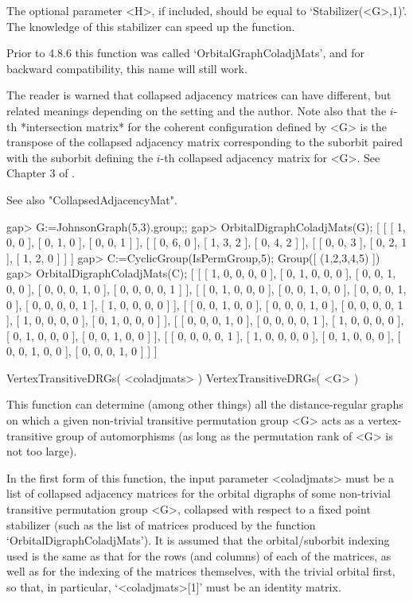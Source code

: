 The optional parameter <H>, if included, should be equal to
`Stabilizer(<G>,1)'. The knowledge of this stabilizer can speed up the
function.

Prior to {\GAP} 4.8.6 this function was called `OrbitalGraphColadjMats',
and for backward compatibility, this name will still work.

The reader is warned that collapsed adjacency matrices can have different,
but related meanings depending on the setting and the author. Note also
that the $i$-th *intersection matrix* for the coherent configuration
defined by <G> is the transpose of the collapsed adjacency matrix
corresponding to the suborbit paired with the suborbit defining the
$i$-th collapsed adjacency matrix for <G>. See Chapter 3 of \cite{Cam99}.

See also "CollapsedAdjacencyMat".

\beginexample
gap> G:=JohnsonGraph(5,3).group;;
gap> OrbitalDigraphColadjMats(G);
[ [ [ 1, 0, 0 ], [ 0, 1, 0 ], [ 0, 0, 1 ] ], 
  [ [ 0, 6, 0 ], [ 1, 3, 2 ], [ 0, 4, 2 ] ], 
  [ [ 0, 0, 3 ], [ 0, 2, 1 ], [ 1, 2, 0 ] ] ]
gap> C:=CyclicGroup(IsPermGroup,5);
Group([ (1,2,3,4,5) ])
gap> OrbitalDigraphColadjMats(C);
[ [ [ 1, 0, 0, 0, 0 ], [ 0, 1, 0, 0, 0 ], [ 0, 0, 1, 0, 0 ], 
      [ 0, 0, 0, 1, 0 ], [ 0, 0, 0, 0, 1 ] ], 
  [ [ 0, 1, 0, 0, 0 ], [ 0, 0, 1, 0, 0 ], [ 0, 0, 0, 1, 0 ], 
      [ 0, 0, 0, 0, 1 ], [ 1, 0, 0, 0, 0 ] ], 
  [ [ 0, 0, 1, 0, 0 ], [ 0, 0, 0, 1, 0 ], [ 0, 0, 0, 0, 1 ], 
      [ 1, 0, 0, 0, 0 ], [ 0, 1, 0, 0, 0 ] ], 
  [ [ 0, 0, 0, 1, 0 ], [ 0, 0, 0, 0, 1 ], [ 1, 0, 0, 0, 0 ], 
      [ 0, 1, 0, 0, 0 ], [ 0, 0, 1, 0, 0 ] ], 
  [ [ 0, 0, 0, 0, 1 ], [ 1, 0, 0, 0, 0 ], [ 0, 1, 0, 0, 0 ], 
      [ 0, 0, 1, 0, 0 ], [ 0, 0, 0, 1, 0 ] ] ]
\endexample


\>VertexTransitiveDRGs( <coladjmats> )
\>VertexTransitiveDRGs( <G> )

This function can determine (among other things) all the distance-regular
graphs on which a given non-trivial transitive permutation group <G>
acts as a vertex-transitive group of automorphisms (as long as the
permutation rank of <G> is not too large).

In the first form of this function, the input parameter <coladjmats> must
be a list of collapsed adjacency matrices for the orbital digraphs of some
non-trivial transitive permutation group <G>, collapsed with respect to a
fixed point stabilizer (such as the list of matrices produced by the function
`OrbitalDigraphColadjMats').  It is assumed that the orbital/suborbit
indexing used is the same as that for the rows (and columns) of each of
the matrices, as well as for the indexing of the matrices themselves,
with the trivial orbital first, so that, in particular, `<coladjmats>[1]'
must be an identity matrix.

